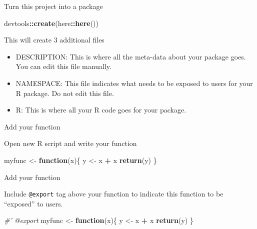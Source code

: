 \documentclass[
  ignorenonframetext,
]{beamer}
\newenvironment{Shaded}{\begin{snugshade}}{\end{snugshade}}
\newcommand{\CommentTok}[1]{\textcolor[rgb]{0.56,0.35,0.01}{\textit{#1}}}
\newcommand{\ControlFlowTok}[1]{\textcolor[rgb]{0.13,0.29,0.53}{\textbf{#1}}}
\newcommand{\KeywordTok}[1]{\textcolor[rgb]{0.13,0.29,0.53}{\textbf{#1}}}
\newcommand{\NormalTok}[1]{#1}
\newcommand{\OperatorTok}[1]{\textcolor[rgb]{0.81,0.36,0.00}{\textbf{#1}}}
\newcommand{\StringTok}[1]{\textcolor[rgb]{0.31,0.60,0.02}{#1}}
\providecommand{\tightlist}{%
  \setlength{\itemsep}{0pt}\setlength{\parskip}{0pt}}
\begin{document}
\begin{frame}[fragile]{Turn this project into a package}
\protect\hypertarget{turn-this-project-into-a-package}{}

\begin{Shaded}
\begin{Highlighting}[]
\NormalTok{devtools}\OperatorTok{::}\KeywordTok{create}\NormalTok{(here}\OperatorTok{::}\KeywordTok{here}\NormalTok{())}
\end{Highlighting}
\end{Shaded}

This will create 3 additional files

\begin{itemize}
\tightlist
\item
  DESCRIPTION: This is where all the meta-data about your package goes.
  You can edit this file manually.
\item
  NAMESPACE: This file indicates what needs to be exposed to users for
  your R package. Do not edit this file.
\item
  R: This is where all your R code goes for your package.
\end{itemize}

\end{frame}

\begin{frame}[fragile]{Add your function}
\protect\hypertarget{add-your-function}{}

Open new R script and write your function

\begin{Shaded}
\begin{Highlighting}[]
\NormalTok{myfunc <-}\StringTok{ }\ControlFlowTok{function}\NormalTok{(x)\{}
\NormalTok{  y <-}\StringTok{ }\NormalTok{x }\OperatorTok{+}\StringTok{ }\NormalTok{x}
  \KeywordTok{return}\NormalTok{(y)}
\NormalTok{\}}
\end{Highlighting}
\end{Shaded}

\end{frame}

\begin{frame}[fragile]{Add your function}
\protect\hypertarget{add-your-function-1}{}

Include \texttt{@export} tag above your function to indicate this
function to be ``exposed'' to users.

\begin{Shaded}
\begin{Highlighting}[]
\CommentTok{#' @export}
\NormalTok{myfunc <-}\StringTok{ }\ControlFlowTok{function}\NormalTok{(x)\{}
\NormalTok{  y <-}\StringTok{ }\NormalTok{x }\OperatorTok{+}\StringTok{ }\NormalTok{x}
  \KeywordTok{return}\NormalTok{(y)}
\NormalTok{\}}
\end{Highlighting}
\end{Shaded}

\end{frame}
\end{document}
